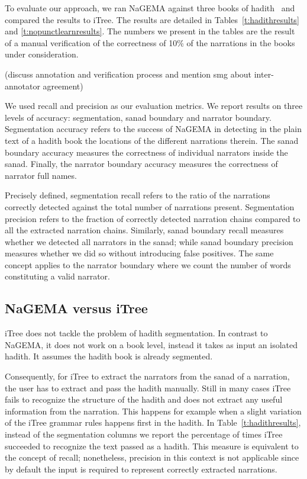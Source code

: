 \documentclass[11pt]{article}
\begin{document}
To evaluate our approach, we ran NaGEMA against three books of 
hadith~\cite{IbnHanbal,AlTousi,AlKulayni} and compared the
results to iTree. 
The results are detailed in 
Tables~\ref{t:hadithresults} and \ref{t:nopunctlearnresults}. 
The numbers we present in the tables are the result of a 
manual verification of the correctness of %
10\% of the narrations in the books under consideration.

(discuss annotation and verification process and mention smg about inter-annotator agreement)

We used recall and precision as our evaluation metrics.
We report results on three levels of accuracy: segmentation, sanad boundary and
narrator boundary. 
Segmentation accuracy refers to the success of NaGEMA in
detecting in the plain text of a hadith book the locations of the different
narrations therein.
The sanad boundary accuracy measures the
correctness of individual narrators inside the sanad. 
Finally, the narrator boundary accuracy measures
the correctness of narrator full names. 

Precisely defined, segmentation recall refers to the ratio of the narrations correctly detected against the
total number of narrations present. 
Segmentation precision refers to the fraction of correctly detected narration chains compared to all the extracted
narration chains. 
Similarly, sanad boundary recall measures whether we detected all narrators
in the sanad; while sanad boundary precision measures whether we did so without introducing false positives. 
The same concept applies to the narrator boundary where we count the number of words constituting 
a valid narrator.

\subsection{NaGEMA versus iTree}

iTree does not tackle the problem of hadith segmentation. 
In contrast to NaGEMA, it does not work on a book level, 
instead it takes as input an isolated hadith. 
It assumes the hadith book is already segmented. 

Consequently, for iTree to extract the narrators from the sanad of a narration, 
the user has to extract and pass the hadith manually.
Still in many cases iTree fails to recognize the structure of
the hadith and does not extract any useful information from the narration. 
This happens for example when a slight variation of the iTree grammar rules 
happens first in the hadith.
In Table~\ref{t:hadithresults}, instead of the segmentation columns 
we report the percentage of times iTree succeeded to recognize the text passed
as a hadith.
This measure is equivalent to the concept of recall; nonetheless, precision
in this context is not applicable since by default the input is required 
to represent correctly extracted narrations.
\end{document}
